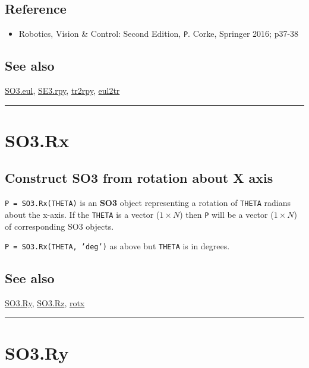 \subsection*{Reference}
\begin{itemize}
  \item Robotics, Vision \& Control: Second Edition, \texttt{P}. Corke, Springer 2016; p37-38
\end{itemize}

\subsection*{See also}


\hyperlink{SO3.eul}{\color{blue} SO3.eul}, \hyperlink{SE3.rpy}{\color{blue} SE3.rpy}, \hyperlink{tr2rpy}{\color{blue} tr2rpy}, \hyperlink{eul2tr}{\color{blue} eul2tr}

\vspace{1.5ex}\hrule

\hypertarget{SO3.Rx}{\section*{SO3.Rx}}
\subsection*{Construct SO3 from rotation about X axis}


\texttt{P = SO3.Rx(THETA)} is an \textbf{\color{red} SO3} object representing a rotation of \texttt{THETA}
radians about the x-axis.  If the \texttt{THETA} is a vector ($1 \times N$) then \texttt{P} will be
a vector ($1 \times N$) of corresponding SO3 objects.



\texttt{P = SO3.Rx(THETA, 'deg')} as above but \texttt{THETA} is in degrees.


\subsection*{See also}


\hyperlink{SO3.Ry}{\color{blue} SO3.Ry}, \hyperlink{SO3.Rz}{\color{blue} SO3.Rz}, \hyperlink{rotx}{\color{blue} rotx}

\vspace{1.5ex}\hrule

\hypertarget{SO3.Ry}{\section*{SO3.Ry}}
